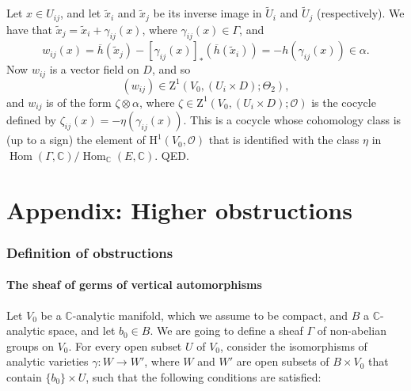 \documentclass{article}
\renewcommand{\cal}[1]{{\mathcal{#1}}}
\newcommand{\CC}{\mathbb{C}}
\newcommand{\HH}{\mathrm{H}}
\DeclareMathOperator{\Hom}{Hom}
\newcommand{\oldpage}[1]{\marginpar{\footnotesize$\Big\vert$ \textit{p.~#1}}}
\begin{document}
Let $x\in U_{ij}$, and let $\widetilde{x}_i$ and $\widetilde{x}_j$ be its inverse image in $\widetilde{U}_i$ and $\widetilde{U}_j$ (respectively).
We have that $\widetilde{x}_j=\widetilde{x}_i+\gamma_{ij}(x)$, where $\gamma_{ij}(x)\in\Gamma$, and
\[
  w_{ij}(x)
  = \overline{h}(\widetilde{x}_j) - [\gamma_{ij}(x)]_*(\overline{h}(\widetilde{x}_i))
  = -h(\gamma_{ij}(x)) \in\alpha.
\]
Now $w_{ij}$ is a vector field on $D$, and so
\[
  (w_{ij}) \in \mathrm{Z}^1(V_0,(U_i\times D);\Theta_2),
\]
and $w_{ij}$ is of the form $\zeta\otimes\alpha$, where $\zeta\in\mathrm{Z}^1(V_0,(U_i\times D);\cal{O})$ is the cocycle defined by $\zeta_{ij}(x)=-\eta(\gamma_{ij}(x))$.
This is a cocycle whose cohomology class is (up to a sign) the element of $\HH^1(V_0,\cal{O})$ that is identified with the class $\eta$ in $\Hom(\Gamma,\CC)/\Hom_{\CC}(E,\CC)$.
QED.



\part*{Appendix: Higher obstructions}
\label{appendix}
\setcounter{section}{0}

\section{Definition of obstructions}
\label{AI}

\subsection{The sheaf of germs of vertical automorphisms}
\label{AI.1}

\oldpage{4-10}

Let $V_0$ be a $\CC$-analytic manifold, which we assume to be compact, and $B$ a $\CC$-analytic space, and let $b_0\in B$.
We are going to define a sheaf $\Gamma$ of non-abelian groups on $V_0$.
For every open subset $U$ of $V_0$, consider the isomorphisms of analytic varieties $\gamma\colon W\to W'$, where $W$ and $W'$ are open subsets of $B\times V_0$ that contain $\{b_0\}\times U$, such that the following conditions are satisfied:






\nocite{*}
\end{document}
